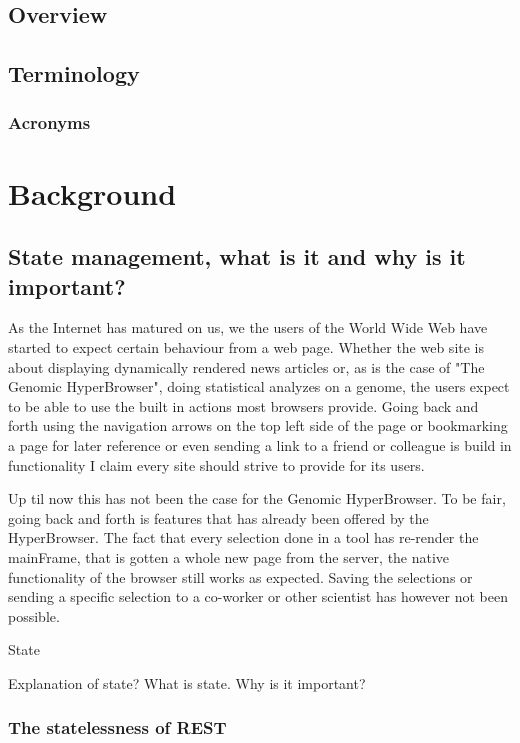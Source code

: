 \documentclass[english]{ifimaster}
\begin{document}
\section{Overview}
\section{Terminology}
\subsection{Acronyms}


\chapter{Background}
\section{State management, what is it and why is it important?}
As the Internet has matured on us, we the users of the World Wide Web have started to expect certain behaviour from a web page\parencite[p.85]{mik}. Whether the web site is about displaying dynamically rendered news articles or, as is the case of "The Genomic HyperBrowser", doing statistical analyzes on a genome, the users expect to be able to use the built in actions most browsers provide. Going back and forth using the navigation arrows on the top left side of the page or bookmarking a page for later reference or even sending a link to a friend or colleague is build in functionality I claim every site should strive to provide for its users. 

Up til now this has not been the case for the Genomic HyperBrowser. To be fair, going back and forth is features that has already been offered by the HyperBrowser. The fact that every selection done in a tool has re-render the mainFrame, that is gotten a whole new page from the server, the native functionality of the browser still works as expected. Saving the selections or sending a specific selection to a co-worker or other scientist has however not been possible.

State


Explanation of state? What is state. Why is it important?
\subsection{The statelessness of REST}
\end{document}
